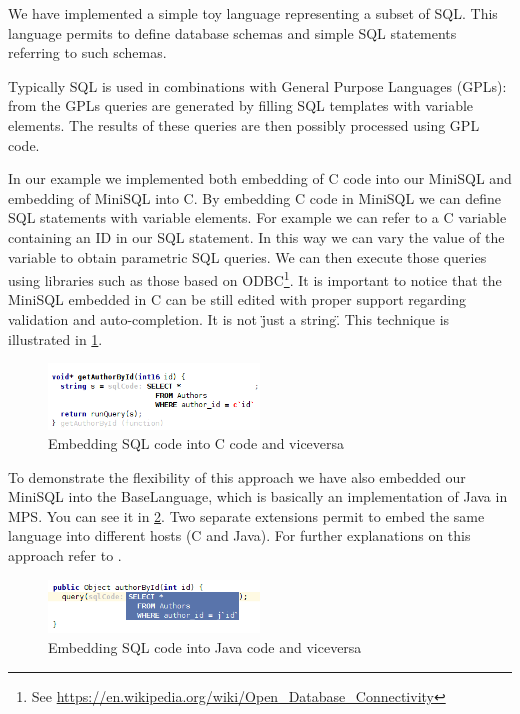 \documentclass[preprint,numbers,10pt]{sigplanconf}
\begin{document}
We have implemented a simple toy language representing a subset of SQL. This language permits to define database schemas and simple SQL statements referring to such schemas.

Typically SQL is used in combinations with General Purpose Languages (GPLs): from the GPLs queries are generated by filling SQL templates with variable elements. The results of these queries are then possibly processed using GPL code.

In our example we implemented both embedding of C code into our MiniSQL and embedding of MiniSQL into C.
By embedding C code in MiniSQL we can define SQL statements with variable elements. For example we can refer to a C variable containing an ID in our SQL statement. In this way we can vary the value of the variable to obtain parametric SQL queries. We can then execute those queries using libraries such as those based on ODBC\footnote{See \url{https://en.wikipedia.org/wiki/Open_Database_Connectivity}}. It is important to notice that the MiniSQL embedded in C can be still edited with proper support regarding validation and auto-completion. It is not \"just a string\".
This technique is illustrated in \ref{fig:sqlembedding}.

\begin{figure}[H]
	\centering
	\includegraphics[width=0.50\textwidth]{screens/minisql_embedded.png}
	\caption{Embedding SQL code into C code and viceversa}
	\label{fig:sqlembedding}
\end{figure}

To demonstrate the flexibility of this approach we have also embedded our MiniSQL into the BaseLanguage, which is basically an implementation of Java in MPS. You can see it in \ref{fig:sqlembeddingjava}. Two separate extensions permit to embed the same language into different hosts (C and Java). For further explanations on this approach refer to \cite{Tomassetti2013}.

\begin{figure}[H]
	\centering
	\includegraphics[width=0.50\textwidth]{screens/minisql_embedded_java.png}
	\caption{Embedding SQL code into Java code and viceversa}
	\label{fig:sqlembeddingjava}
\end{figure}
\end{document}

